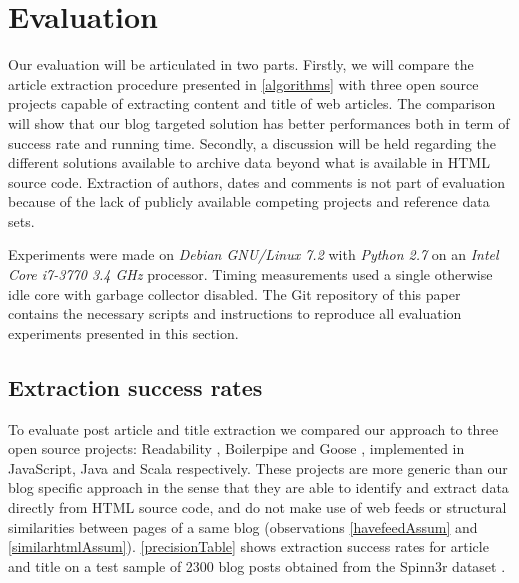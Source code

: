 \section{Evaluation}

Our evaluation will be articulated in two parts. Firstly, we will compare the article extraction procedure presented in \autoref{algorithms} with three open source projects capable of extracting content and title of web articles. The comparison will show that our blog targeted solution has better performances both in term of success rate and running time. Secondly, a discussion will be held regarding the different solutions available to archive data beyond what is available in HTML source code. Extraction of authors, dates and comments is not part of evaluation because of the lack of publicly available competing projects and reference data sets.

Experiments were made on \emph{Debian GNU/Linux 7.2} with \emph{Python 2.7} on an \emph{Intel Core i7-3770 3.4 GHz} processor. Timing measurements used a single otherwise idle core with garbage collector disabled. The Git repository of this paper \cite{blogforever-crawler-publication}  contains the necessary scripts and instructions to reproduce all evaluation experiments presented in this section.


\subsection{Extraction success rates}
To evaluate post article and title extraction we compared our approach to three open source projects: Readability \cite{python-readability2011}, Boilerpipe \cite{kohlschuetter2010} and Goose \cite{goose2012}, implemented in JavaScript, Java and Scala respectively. These projects are more generic than our blog specific approach in the sense that they are able to identify and extract data directly from HTML source code, and do not make use of web feeds or structural similarities between pages of a same blog (observations \ref{havefeedAssum} and \ref{similarhtmlAssum}). \autoref{precisionTable} shows extraction success rates for article and title on a test sample of 2300 blog posts obtained from the Spinn3r dataset \cite{burton2011}.


